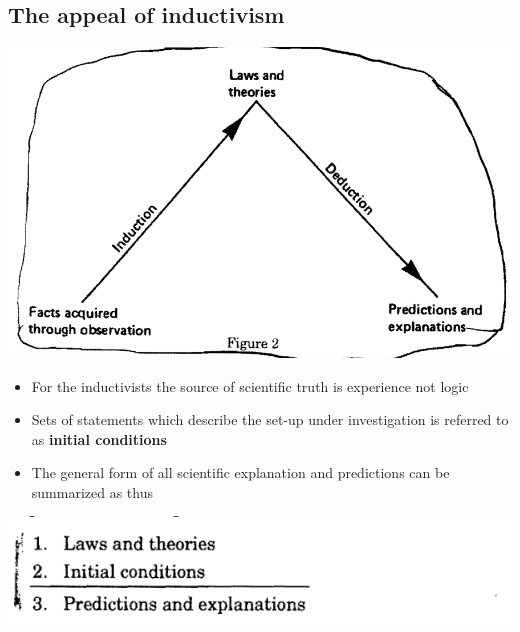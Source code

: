 \documentclass[11pt]{article}
\begin{document}
\subsection{The appeal of inductivism}
\label{sec:orgb8dcdd5}
\begin{center}
\includegraphics[width=.9\linewidth]{Induction/screenshot_2019-01-27_16-26-08.png}
\end{center} 

\begin{itemize}
\item For the inductivists the source of scientific truth is experience not logic
\item Sets of statements which describe the set-up under investigation is referred to as \textbf{initial conditions}
\item The general form of all scientific explanation and predictions can be summarized as thus
\end{itemize}
\begin{center}
\includegraphics[width=.9\linewidth]{Induction/screenshot_2019-01-27_16-33-38.png}
\end{center} 
\end{document}
